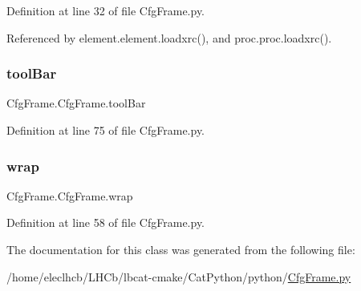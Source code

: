 Definition at line 32 of file Cfg\+Frame.\+py.



Referenced by element.\+element.\+loadxrc(), and proc.\+proc.\+loadxrc().

\mbox{\label{classCfgFrame_1_1CfgFrame_a8bfc109a2a8e05a0fa21262b0692727b}} 
\subsubsection{\texorpdfstring{tool\+Bar}{toolBar}}
{\footnotesize\ttfamily Cfg\+Frame.\+Cfg\+Frame.\+tool\+Bar}



Definition at line 75 of file Cfg\+Frame.\+py.

\mbox{\label{classCfgFrame_1_1CfgFrame_ac0c4e476c6ffc2a0cd485c6c11b4178d}} 
\subsubsection{\texorpdfstring{wrap}{wrap}}
{\footnotesize\ttfamily Cfg\+Frame.\+Cfg\+Frame.\+wrap}



Definition at line 58 of file Cfg\+Frame.\+py.



The documentation for this class was generated from the following file\+:\begin{DoxyCompactItemize}
\item 
/home/eleclhcb/\+L\+H\+Cb/lbcat-\/cmake/\+Cat\+Python/python/\hyperlink{CfgFrame_8py}{Cfg\+Frame.\+py}\end{DoxyCompactItemize}
